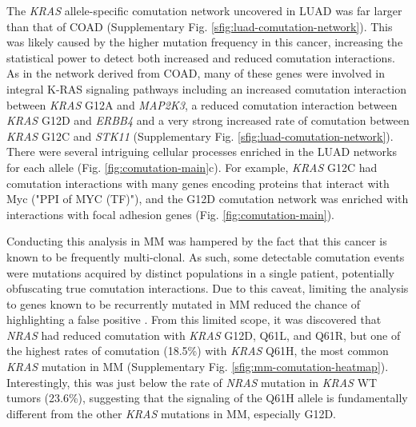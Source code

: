 \documentclass[english, 10pt, letterpaper]{article}
\newcommand{\KRAS}{\emph{KRAS}}
\newcommand{\kras}{K-RAS}
\begin{document}
The \KRAS{} allele-specific comutation network uncovered in LUAD was far larger than that of COAD (Supplementary Fig. \ref{sfig:luad-comutation-network}).
This was likely caused by the higher mutation frequency in this cancer, increasing the statistical power to detect both increased and reduced comutation interactions.
As in the network derived from COAD, many of these genes were involved in integral \kras{} signaling pathways including an increased comutation interaction between \KRAS{} G12A and \emph{MAP2K3}, a reduced comutation interaction between \KRAS{} G12D and \emph{ERBB4} and a very strong increased rate of comutation between \KRAS{} G12C and \emph{STK11} (Supplementary Fig. \ref{sfig:luad-comutation-network}).
There were several intriguing cellular processes enriched in the LUAD networks for each allele (Fig. \ref{fig:comutation-main}c).
For example, \KRAS{} G12C had comutation interactions with many genes encoding proteins that interact with Myc ("PPI of MYC (TF)"), and the G12D comutation network was enriched with interactions with focal adhesion genes (Fig. \ref{fig:comutation-main}).

Conducting this analysis in MM was hampered by the fact that this cancer is known to be frequently multi-clonal.
As such, some detectable comutation events were mutations acquired by distinct populations in a single patient, potentially obfuscating true comutation interactions.
Due to this caveat, limiting the analysis to genes known to be recurrently mutated in MM reduced the chance of highlighting a false positive \cite{Sondka2018, Lohr2014WidespreadTherapy.}.
From this limited scope, it was discovered that \emph{NRAS} had reduced comutation with \KRAS{} G12D, Q61L, and Q61R, but one of the highest rates of comutation (18.5\%) with \KRAS{} Q61H, the most common \KRAS{} mutation in MM (Supplementary Fig. \ref{sfig:mm-comutation-heatmap}).
Interestingly, this was just below the rate of \emph{NRAS} mutation in \KRAS{} WT tumors (23.6\%), suggesting that the signaling of the Q61H allele is fundamentally different from the other \KRAS{} mutations in MM, especially G12D.
\end{document}
